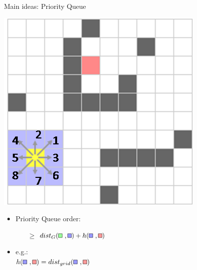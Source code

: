 \documentclass{presentation}
\newcommand{\rect}[1]{\tikz{\path[draw=black,fill=#1] (0,0) rectangle (2mm,2mm);}}
\newcommand{\grect}{\rect{white!60!green}}
\newcommand{\rrect}{\rect{white!60!red}}
\newcommand{\lrect}{\rect{white!60!blue}}
\begin{document}
\begin{frame}{Main ideas: Priority Queue}
    	\begin{minipage}{0.3\textwidth}
		\includegraphics[width=\textwidth]{figures/A-Stern_geschnitten(241x241)/2(priorityqueue).png}
	\end{minipage}%
	\hfill%
	\begin{minipage}{0.6\textwidth}
		\begin{itemize}
			\item Priority Queue order:
			\begin{itemize}
				\item[$\geq$] $dist_G(\grect\ ,\lrect)+h(\lrect\ , \rrect)$
			\end{itemize}
			\pause
			\item e.g.:\\
			$h(\lrect\ , \rrect) = dist_{grid}(\lrect\ , \rrect)$
		\end{itemize}
	\end{minipage}
\end{frame}
\end{document}
